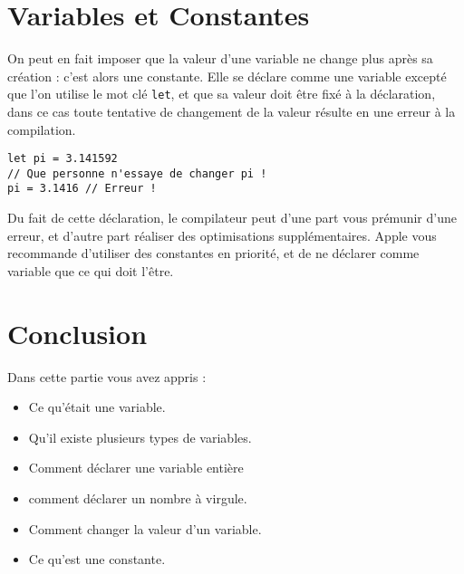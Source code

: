 \section{Variables et Constantes}
On peut en fait imposer que la valeur d'une variable ne change plus après sa création :
c'est alors une constante. Elle se déclare comme une variable excepté que l'on utilise le
mot clé \texttt{let}, et que sa valeur doit être fixé à la déclaration, dans ce cas toute tentative de changement de la valeur résulte en une erreur à la compilation.
\begin{listing}[h]
\begin{verbatim}
let pi = 3.141592
// Que personne n'essaye de changer pi !
pi = 3.1416 // Erreur !
\end{verbatim}
\end{listing}

Du fait de cette déclaration, le compilateur peut d'une part vous prémunir d'une erreur, et
d'autre part réaliser des optimisations supplémentaires. Apple vous recommande d'utiliser
des constantes en priorité, et de ne déclarer comme variable que ce qui doit l'être.
\section*{Conclusion}
{}
Dans cette partie vous avez appris :
\begin{itemize}
\item Ce qu'était une variable.
\item Qu'il existe plusieurs types de variables.
\item Comment déclarer une variable entière
\item comment déclarer un nombre à virgule.
\item Comment changer la valeur d'un variable.
\item Ce qu'est une constante.
\end{itemize}
